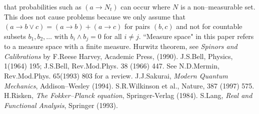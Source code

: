 \documentclass[12pt]{article}
\begin{document}
\begin{thebibliography}{10}
that probabilities such as $(a\rightarrow N_t)$ can occur where $N$ is a non--measurable
set.  This does not cause problems because we only assume that 
$(a\rightarrow b\vee c)=(a\rightarrow b)+(a\rightarrow c)$ for pairs $(b,c)$ and not
for countable subsets $b_1,b_2,\dots$ with $b_i\wedge b_j=0$ for all $i\neq j$.  ``Measure
space" in this paper refers to a measure space with a finite measure.
 Hurwitz theorem, see {\it Spinors and Calibrations} by F.Reese Harvey, Academic Press, 
(1990).
 J.S.Bell, Physics, 1(1964) 195; J.S.Bell, Rev.Mod.Phys. 38 (1966) 447.  See
N.D.Mermin, Rev.Mod.Phys. 65(1993) 803 for a review.
 J.J.Sakurai, {\it Modern Quantum Mechanics}, Addison--Wesley (1994).
 S.R.Wilkinson et al., Nature, 387 (1997) 575.
 H.Risken, {\it The Fokker--Planck equation}, Springer-Verlag (1984).
 S.Lang, {\it Real and Functional Analysis}, Springer (1993).

\end{thebibliography}
\end{document}
